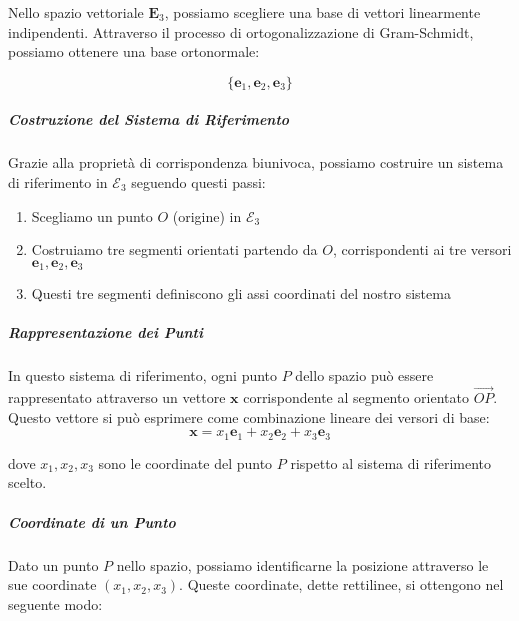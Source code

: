 \documentclass{article}
\theoremstyle{plain}
\theoremstyle{definition}
\theoremstyle{remark}
\begin{document}
Nello spazio vettoriale $\mathbf{E}_3$, possiamo scegliere una base di vettori linearmente indipendenti. Attraverso il processo di ortogonalizzazione di Gram-Schmidt, possiamo ottenere una base ortonormale:

\[\{\mathbf{e}_1, \mathbf{e}_2, \mathbf{e}_3\}\]

\subparagraph{Costruzione del Sistema di Riferimento}

Grazie alla proprietà di corrispondenza biunivoca, possiamo costruire un sistema di riferimento in $\mathcal{E}_3$ seguendo questi passi:

\begin{enumerate}
    \item Scegliamo un punto $O$ (origine) in $\mathcal{E}_3$
    \item Costruiamo tre segmenti orientati partendo da $O$, corrispondenti ai tre versori $\mathbf{e}_1, \mathbf{e}_2, \mathbf{e}_3$
    \item Questi tre segmenti definiscono gli assi coordinati del nostro sistema
\end{enumerate}

\begin{center}
\end{center}

\subparagraph{Rappresentazione dei Punti}

In questo sistema di riferimento, ogni punto $P$ dello spazio può essere rappresentato attraverso un vettore $\mathbf{x}$ corrispondente al segmento orientato $\overrightarrow{OP}$. Questo vettore si può esprimere come combinazione lineare dei versori di base:
\[\mathbf{x} = x_1\mathbf{e}_1 + x_2\mathbf{e}_2 + x_3\mathbf{e}_3\]

dove $x_1, x_2, x_3$ sono le coordinate del punto $P$ rispetto al sistema di riferimento scelto.

\subparagraph{Coordinate di un Punto}

Dato un punto $P$ nello spazio, possiamo identificarne la posizione attraverso le sue coordinate $(x_1,x_2,x_3)$. Queste coordinate, dette rettilinee, si ottengono nel seguente modo:
\end{document}
